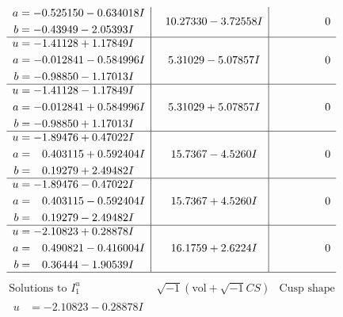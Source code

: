 \documentclass[1p]{elsarticle_modified}
\theoremstyle{definition}
\newcommand{\I}{\sqrt{-1}}
\begin{document}
$$\begin{array}{c|c|c}
\begin{aligned}
a &= -0.525150 - 0.634018 I \\
b &= -0.43949 - 2.05393 I\end{aligned}
 & \phantom{-}10.27330 - 3.72558 I & \phantom{-0.000000 } 0 \\ \hline\begin{aligned}
u &= -1.41128 + 1.17849 I \\
a &= -0.012841 - 0.584996 I \\
b &= -0.98850 - 1.17013 I\end{aligned}
 & \phantom{-}5.31029 - 5.07857 I & \phantom{-0.000000 } 0 \\ \hline\begin{aligned}
u &= -1.41128 - 1.17849 I \\
a &= -0.012841 + 0.584996 I \\
b &= -0.98850 + 1.17013 I\end{aligned}
 & \phantom{-}5.31029 + 5.07857 I & \phantom{-0.000000 } 0 \\ \hline\begin{aligned}
u &= -1.89476 + 0.47022 I \\
a &= \phantom{-}0.403115 + 0.592404 I \\
b &= \phantom{-}0.19279 + 2.49482 I\end{aligned}
 & \phantom{-}15.7367 - 4.5260 I & \phantom{-0.000000 } 0 \\ \hline\begin{aligned}
u &= -1.89476 - 0.47022 I \\
a &= \phantom{-}0.403115 - 0.592404 I \\
b &= \phantom{-}0.19279 - 2.49482 I\end{aligned}
 & \phantom{-}15.7367 + 4.5260 I & \phantom{-0.000000 } 0 \\ \hline\begin{aligned}
u &= -2.10823 + 0.28878 I \\
a &= \phantom{-}0.490821 - 0.416004 I \\
b &= \phantom{-}0.36444 - 1.90539 I\end{aligned}
 & \phantom{-}16.1759 + 2.6224 I & \phantom{-0.000000 } 0\\
 \hline 
 \end{array}$$\newpage$$\begin{array}{c|c|c}  
\text{Solutions to }I^u_{1}& \I (\text{vol} + \sqrt{-1}CS) & \text{Cusp shape}\\
 \hline 
\begin{aligned}
u &= -2.10823 - 0.28878 I \\

\end{aligned}
\end{array}$$
\end{document}
